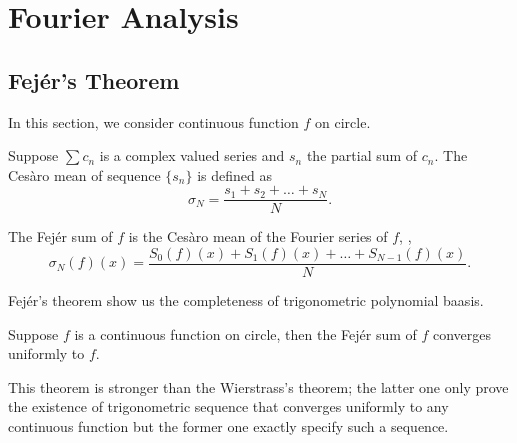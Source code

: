 \chapter{Fourier Analysis}
\section{Fejér's Theorem}
In this section, we consider continuous function $f$ on circle. 
\begin{defn}
Suppose $\sum c_n$ is a complex valued series and $s_n$ the partial sum 
of $c_n$. The Cesàro mean of sequence $\{s_n\}$ is defined as 
\begin{equation}
\sigma_N = \frac{s_1 + s_2 + \ldots + s_N}{N}.
\end{equation}
\end{defn}
\begin{defn}
The Fejér sum of $f$ is the Cesàro mean of the Fourier series of $f$, \ie, 
\begin{equation}
\sigma_N (f)(x) = \frac{S_0(f)(x) + S_1(f)(x) + \ldots + S_{N-1}(f)(x)}
{N}.
\end{equation}
\end{defn}

Fejér's theorem show us the completeness of trigonometric polynomial baasis.

\begin{thm}
Suppose $f$ is a continuous function on circle, then the Fejér sum of $f$ 
converges uniformly to $f$.
\end{thm}
\begin{rmk}
This theorem is stronger than the Wierstrass's theorem; the latter one 
only prove the existence of trigonometric sequence that converges uniformly 
to any continuous function but the former one exactly specify such a
sequence.
\end{rmk}